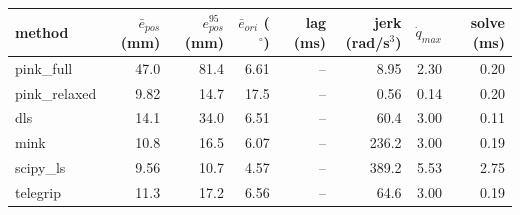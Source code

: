 \begin{tabular}{lrrrrrrr}
\toprule
method & $\bar{e}_{pos}$ (mm) & $e_{pos}^{95}$ (mm) & $\bar{e}_{ori}$ ($^\circ$) & lag (ms) & jerk (rad/s$^3$) & $\dot{q}_{max}$ & solve (ms) \\
\midrule
pink\_full & 47.0 & 81.4 & 6.61 & -- & 8.95 & 2.30 & 0.20 \\
pink\_relaxed & 9.82 & 14.7 & 17.5 & -- & 0.56 & 0.14 & 0.20 \\
dls & 14.1 & 34.0 & 6.51 & -- & 60.4 & 3.00 & 0.11 \\
mink & 10.8 & 16.5 & 6.07 & -- & 236.2 & 3.00 & 0.19 \\
scipy\_ls & 9.56 & 10.7 & 4.57 & -- & 389.2 & 5.53 & 2.75 \\
telegrip & 11.3 & 17.2 & 6.56 & -- & 64.6 & 3.00 & 0.19 \\
\bottomrule
\end{tabular}
